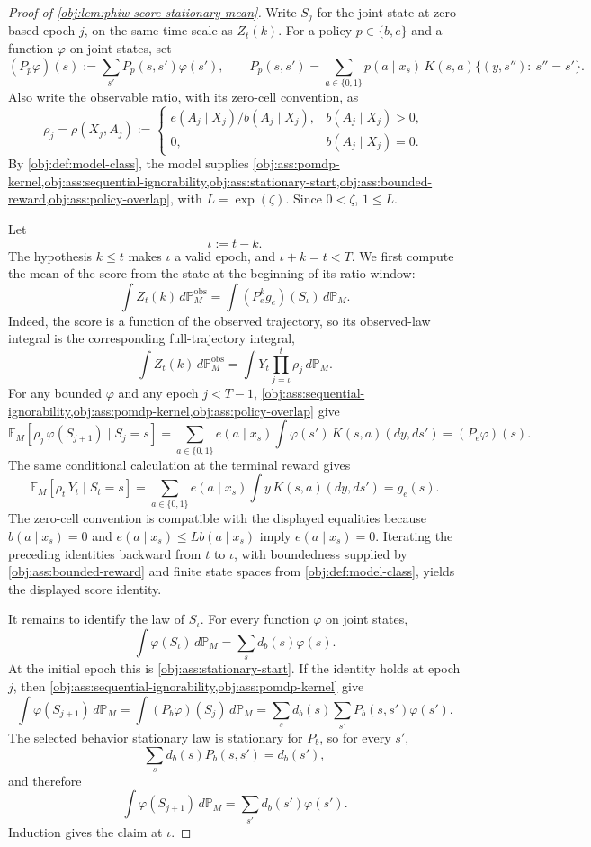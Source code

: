 \documentclass[11pt]{article}
\begin{document}
\begin{proof}[Proof of \cref{obj:lem:phiw-score-stationary-mean}]
Write \(S_j\) for the joint state at zero-based epoch \(j\), on the same time scale as \(Z_t(k)\). For a policy \(p\in\{b,e\}\) and a function \(\varphi\) on joint states, set
\[
(P_p\varphi)(s)
:=
\sum_{s'} P_p(s,s')\varphi(s'),
\qquad
P_p(s,s')
=
\sum_{a\in\{0,1\}}p(a\mid x_s)\,
K(s,a)\{(y,s''):\ s''=s'\}.
\]
Also write the observable ratio, with its zero-cell convention, as
\[
\rho_j
=
\rho(X_j,A_j)
:=
\begin{cases}
e(A_j\mid X_j)/b(A_j\mid X_j),& b(A_j\mid X_j)>0,\\
0,& b(A_j\mid X_j)=0.
\end{cases}
\]
By \cref{obj:def:model-class}, the model supplies \cref{obj:ass:pomdp-kernel,obj:ass:sequential-ignorability,obj:ass:stationary-start,obj:ass:bounded-reward,obj:ass:policy-overlap}, with \(L=\exp(\zeta)\). Since \(0<\zeta\), \(1\le L\).

Let
\[
\iota:=t-k .
\]
The hypothesis \(k\le t\) makes \(\iota\) a valid epoch, and \(\iota+k=t<T\). We first compute the mean of the score from the state at the beginning of its ratio window:
\[
\int Z_t(k)\,d\mathbb P_M^{\mathrm{obs}}
=
\int (P_e^k g_e)(S_\iota)\,d\mathbb P_M .
\]
Indeed, the score is a function of the observed trajectory, so its observed-law integral is the corresponding full-trajectory integral,
\[
\int Z_t(k)\,d\mathbb P_M^{\mathrm{obs}}
=
\int
Y_t\prod_{j=\iota}^{t}\rho_j
\,d\mathbb P_M .
\]
For any bounded \(\varphi\) and any epoch \(j<T-1\), \cref{obj:ass:sequential-ignorability,obj:ass:pomdp-kernel,obj:ass:policy-overlap} give
\[
\mathbb E_M\!\left[\rho_j\,\varphi(S_{j+1})\mid S_j=s\right]
=
\sum_{a\in\{0,1\}} e(a\mid x_s)
\int \varphi(s')\,K(s,a)(dy,ds')
=
(P_e\varphi)(s).
\]
The same conditional calculation at the terminal reward gives
\[
\mathbb E_M\!\left[\rho_t\,Y_t\mid S_t=s\right]
=
\sum_{a\in\{0,1\}} e(a\mid x_s)
\int y\,K(s,a)(dy,ds')
=
g_e(s).
\]
The zero-cell convention is compatible with the displayed equalities because \(b(a\mid x_s)=0\) and \(e(a\mid x_s)\le Lb(a\mid x_s)\) imply \(e(a\mid x_s)=0\). Iterating the preceding identities backward from \(t\) to \(\iota\), with boundedness supplied by \cref{obj:ass:bounded-reward} and finite state spaces from \cref{obj:def:model-class}, yields the displayed score identity.

It remains to identify the law of \(S_\iota\). For every function \(\varphi\) on joint states,
\[
\int \varphi(S_\iota)\,d\mathbb P_M
=
\sum_s d_b(s)\varphi(s).
\]
At the initial epoch this is \cref{obj:ass:stationary-start}. If the identity holds at epoch \(j\), then \cref{obj:ass:sequential-ignorability,obj:ass:pomdp-kernel} give
\[
\int \varphi(S_{j+1})\,d\mathbb P_M
=
\int (P_b\varphi)(S_j)\,d\mathbb P_M
=
\sum_s d_b(s)\sum_{s'}P_b(s,s')\varphi(s').
\]
The selected behavior stationary law is stationary for \(P_b\), so for every \(s'\),
\[
\sum_s d_b(s)P_b(s,s')=d_b(s'),
\]
and therefore
\[
\int \varphi(S_{j+1})\,d\mathbb P_M
=
\sum_{s'}d_b(s')\varphi(s').
\]
Induction gives the claim at \(\iota\).


\end{proof}
\end{document}
